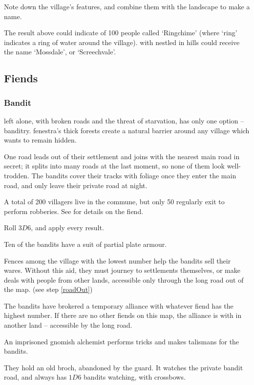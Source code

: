 \begin{multicols}{2}
Note down the \gls{village}'s features, and combine them with the landscape to make a name.


The result above could indicate  of 100 people called `Ringchime' (where `ring' indicates a ring of water around the \gls{village}).
 with  nestled in hills could receive the name `Mossdale', or `Screechvale'.

\subsection{Fiends}
\label{mapFiends}

\subsubsection{Bandit }
\label{banditsPoint}

 left alone, with broken roads and the threat of starvation, has only one option -- banditry.
\Gls{fenestra}'s thick forests create a natural barrier around any \gls{village} which wants to remain hidden.

One road leads out of their settlement and joins with the nearest main road in secret; it splits into many roads at the last moment, so none of them look well-trodden.
The bandits cover their tracks with foliage once they enter the main road, and only leave their private road at night.

A total of 200 villagers live in the commune, but only 50 regularly exit to perform robberies.
See  for details on the \gls{fiend}.

Roll $3D6$, and apply every result.

\begin{dlist}
  \item
  Ten of the bandits have a suit of partial plate armour.
  \item
  Fences among the \gls{village} with the lowest number help the bandits sell their wares.
  Without this aid, they must journey to settlements themselves, or make deals with people from other lands, accessible only through the long road out of the map.
  (see step \vref{roadOut})
  \item
  The bandits have brokered a temporary alliance with whatever \gls{fiend} has the highest number.
  If there are no other \glspl{fiend} on this map, the alliance is with  in another land -- accessible by the long road.
  \item
  An imprisoned gnomish alchemist performs tricks and makes \glspl{talisman} for the bandits.
  \item
  They hold an old \gls{broch}, abandoned by the \gls{guard}.
  It watches the private bandit road, and always has $1D6$ bandits watching, with crossbows.


\end{dlist}
\end{multicols}
